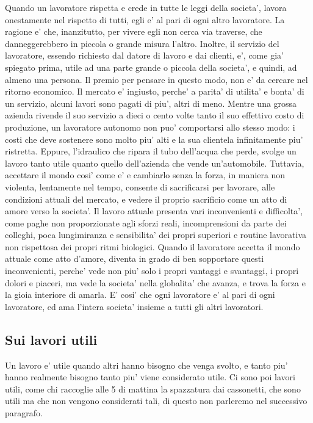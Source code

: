 Quando un lavoratore rispetta e crede in tutte le leggi della societa', lavora onestamente nel rispetto di tutti, egli e' al pari di ogni altro lavoratore. La ragione e' che, inanzitutto, per vivere egli non cerca via traverse, che danneggerebbero in piccola o grande misura l'altro. Inoltre, il servizio del lavoratore, essendo richiesto dal datore di lavoro e dai clienti, e', come gia' spiegato prima, utile ad una parte grande o piccola della societa', e quindi, ad almeno una persona.
  Il premio per pensare in questo modo, non e' da cercare nel ritorno economico. Il mercato e' ingiusto, perche' a parita' di utilita' e bonta' di un servizio, alcuni lavori sono pagati di piu', altri di meno. Mentre una grossa azienda rivende il suo servizio a dieci o cento volte tanto il suo effettivo costo di produzione, un lavoratore autonomo non puo' comportarsi allo stesso modo: i costi che deve sostenere sono molto piu' alti e la sua clientela infinitamente piu' ristretta. Eppure, l'idraulico che ripara il tubo dell'acqua che perde, svolge un lavoro tanto utile quanto quello dell'azienda che vende un'automobile.
Tuttavia, accettare il mondo cosi' come e' e cambiarlo senza la forza, in maniera non violenta, lentamente nel tempo, consente di sacrificarsi per lavorare, alle condizioni attuali del mercato, e vedere il proprio sacrificio come un atto di amore verso la societa'. Il lavoro attuale presenta vari inconvenienti e difficolta', come paghe non proporzionate agli sforzi reali, incomprensioni da parte dei colleghi, poca lungimiranza e sensibilita' dei propri superiori e routine lavorativa non rispettosa dei propri ritmi biologici. Quando il lavoratore accetta il mondo attuale come atto d'amore, diventa in grado di ben sopportare questi inconvenienti, perche' vede non piu' solo i propri vantaggi e svantaggi, i propri dolori e piaceri, ma vede la societa' nella globalita' che avanza, e trova la forza e la gioia interiore di amarla. 
E' cosi' che ogni lavoratore e' al pari di ogni lavoratore, ed ama l'intera societa' insieme a tutti gli altri lavoratori.

\subsection{Sui lavori utili}
Un lavoro e' utile quando altri hanno bisogno che venga svolto, e tanto piu' hanno realmente bisogno tanto piu' viene considerato utile. Ci sono poi lavori utili, come chi raccoglie alle 5 di mattina la spazzatura dai cassonetti, che sono utili ma che non vengono considerati tali, di questo non parleremo nel successivo paragrafo.

